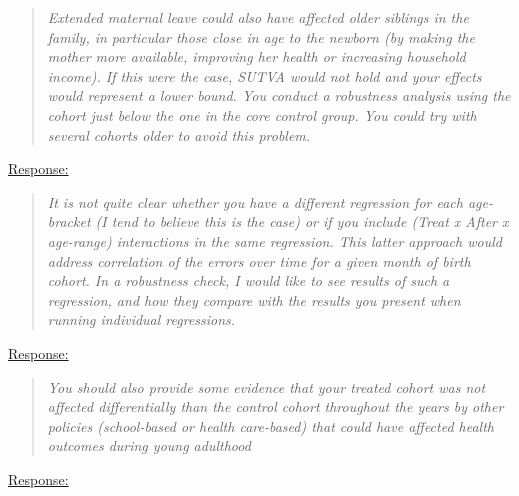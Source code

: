 \begin{quote}
	\textit{Extended maternal leave could also have affected older siblings in the family, in particular those close in age to the newborn (by making the mother more available, improving her health or increasing household income). If this were the case, SUTVA would not hold and your effects would represent a lower bound. You conduct a robustness analysis using the cohort just below the one in the core control group. You could try with several cohorts older to avoid this problem.}
\end{quote}
\underline{Response:}


\begin{quote}
	\textit{It is not quite clear whether you have a different regression for each age-bracket (I tend to believe this is the case) or if you include (Treat x After x age-range) interactions in the same regression. This latter approach would address correlation of the errors over time for a given month of birth cohort. In a robustness check, I would like to see results of such a regression, and how they compare with the results you present when running individual regressions.}
\end{quote}
\underline{Response:}

























\begin{quote}
	\textit{You should also provide some evidence that your treated cohort was not affected differentially than the control cohort throughout the years by other policies (school-based or health care-based) that could have affected health outcomes during young adulthood}
\end{quote}
\underline{Response:}











